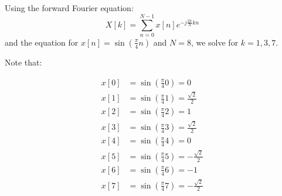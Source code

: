 \documentclass{article}
\begin{document}
\section{}
Using the forward Fourier equation: \[X[k] = \sum_{n=0}^{N-1} x[n] e^{-j\frac{2\pi}{N}kn}\] and the
equation for $x[n] = \sin(\frac{\pi}{4}n)$ and $N = 8$, we solve for $k = 1, 3, 7$.

Note that:

\begin{align*}
x[0] &= \sin(\frac{\pi}{4}0) = 0 \\
x[1] &= \sin(\frac{\pi}{4}1) = \frac{\sqrt{2}}{2} \\
x[2] &= \sin(\frac{\pi}{4}2) = 1 \\
x[3] &= \sin(\frac{\pi}{4}3) = \frac{\sqrt{2}}{2} \\
x[4] &= \sin(\frac{\pi}{4}4) = 0 \\
x[5] &= \sin(\frac{\pi}{4}5) = -\frac{\sqrt{2}}{2} \\
x[6] &= \sin(\frac{\pi}{4}6) = -1 \\
x[7] &= \sin(\frac{\pi}{4}7) = -\frac{\sqrt{2}}{2} \\
\end{align*}
\end{document}
